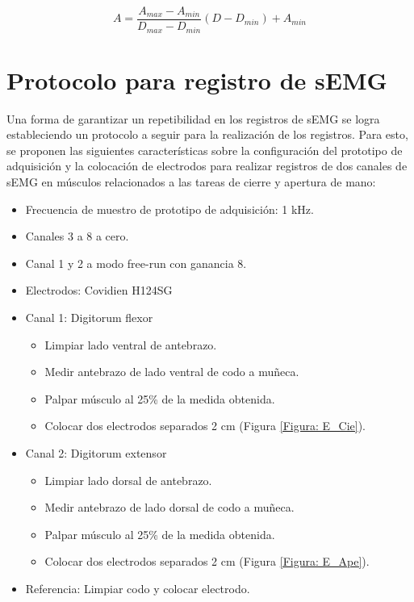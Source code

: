 \begin{equation}
	A = \frac{A_{max} - A_{min}}{D_{max} - D_{min}}(D - D_{min}) + A_{min}
	\label{Mapeo}
\end{equation}

\section{Protocolo para registro de sEMG}
Una forma de garantizar un repetibilidad en los registros de sEMG se logra estableciendo un protocolo a seguir para la realización de los registros. Para esto, se proponen las siguientes características sobre la configuración del prototipo de adquisición y la colocación de electrodos para realizar registros de dos canales de sEMG en músculos relacionados a las tareas de cierre y apertura de mano:

\begin{itemize}
	\item Frecuencia de muestro de prototipo de adquisición: 1 kHz.
	\item Canales 3 a 8 a cero.
	\item Canal 1 y 2 a modo free-run con ganancia 8.
	\item Electrodos: Covidien H124SG
	\item Canal 1: Digitorum flexor
	\begin{itemize}
		\item Limpiar lado ventral de antebrazo.
		\item Medir antebrazo de lado ventral de codo a muñeca.
		\item Palpar músculo al 25\% de la medida obtenida.
		\item Colocar dos electrodos separados 2 cm (Figura \ref{Figura: E_Cie}).
	\end{itemize}
	\item Canal 2: Digitorum extensor
	\begin{itemize}
		\item Limpiar lado dorsal de antebrazo.
		\item Medir antebrazo de lado dorsal de codo a muñeca.
		\item Palpar músculo al 25\% de la medida obtenida.
		\item Colocar dos electrodos separados 2 cm (Figura \ref{Figura: E_Ape}).
	\end{itemize}
	\item Referencia: Limpiar codo y colocar electrodo.
\end{itemize}

